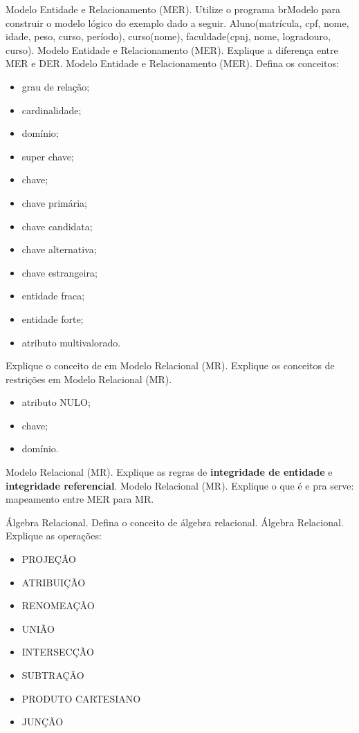 \documentclass[12pt,answers]{exam}
\begin{document}
\begin{questions}
\question  Modelo Entidade e Relacionamento (MER). Utilize o programa brModelo para construir o modelo lógico do exemplo dado a seguir. Aluno(matrícula, cpf, nome, idade, peso, curso, período), curso(nome), faculdade(cpnj, nome, logradouro, curso).
\question Modelo Entidade e Relacionamento (MER). Explique a diferença entre MER e DER.
\question Modelo Entidade e Relacionamento (MER). Defina os conceitos:
\begin{itemize}
    \item grau de relação;
    \item cardinalidade;
    \item domínio;
    \item super chave;
    \item chave;
    \item chave primária;
    \item chave candidata;
    \item chave alternativa;
    \item chave estrangeira;
    \item entidade fraca;
    \item entidade forte;
    \item atributo multivalorado.
\end{itemize}

\question Explique o conceito de  em Modelo Relacional (MR).
\question Explique os conceitos de restrições em Modelo Relacional (MR).
\begin{itemize}
    \item atributo NULO;
    \item chave;
    \item domínio.
\end{itemize}

\question Modelo Relacional (MR). Explique as regras de \textbf{integridade de entidade} e \textbf{integridade referencial}.
\question Modelo Relacional (MR). Explique o que é e pra serve: mapeamento entre MER para MR.

\question Álgebra Relacional. Defina o conceito de álgebra relacional.
\question Álgebra Relacional. Explique as operações:
\begin{itemize}
    \item PROJEÇÃO
    \item ATRIBUIÇÃO
    \item RENOMEAÇÃO
    \item UNIÃO
    \item INTERSECÇÃO
    \item SUBTRAÇÃO
    \item PRODUTO CARTESIANO
    \item JUNÇÃO
\end{itemize}



\end{questions}
\end{document}
